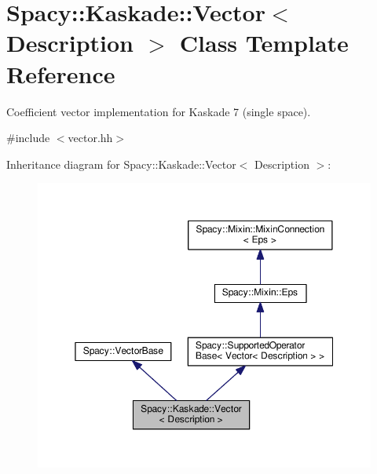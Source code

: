 \hypertarget{classSpacy_1_1Kaskade_1_1Vector}{}\section{Spacy\+:\+:Kaskade\+:\+:Vector$<$ Description $>$ Class Template Reference}
\label{classSpacy_1_1Kaskade_1_1Vector}


Coefficient vector implementation for Kaskade 7 (single space).  




{\ttfamily \#include $<$vector.\+hh$>$}



Inheritance diagram for Spacy\+:\+:Kaskade\+:\+:Vector$<$ Description $>$\+:\nopagebreak
\begin{figure}[H]
\begin{center}
\leavevmode
\includegraphics[width=350pt]{classSpacy_1_1Kaskade_1_1Vector__inherit__graph}
\end{center}
\end{figure}


